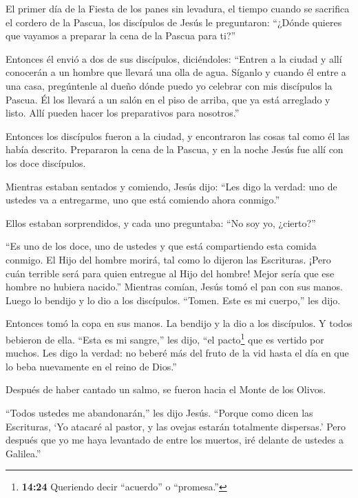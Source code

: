  El primer día de la Fiesta de los panes sin levadura, el
tiempo cuando se sacrifica el cordero de la Pascua, los discípulos de
Jesús le preguntaron: ``¿Dónde quieres que vayamos a preparar la cena de
la Pascua para ti?''

 Entonces él envió a dos de sus discípulos, diciéndoles:
``Entren a la ciudad y allí conocerán a un hombre que llevará una olla
de agua. Síganlo  y cuando él entre a una casa, pregúntenle
al dueño dónde puedo yo celebrar con mis discípulos la Pascua.
 Él los llevará a un salón en el piso de arriba, que ya
está arreglado y listo. Allí pueden hacer los preparativos para
nosotros.''

 Entonces los discípulos fueron a la ciudad, y encontraron
las cosas tal como él las había descrito. Prepararon la cena de la
Pascua,  y en la noche Jesús fue allí con los doce
discípulos.

 Mientras estaban sentados y comiendo, Jesús dijo: ``Les
digo la verdad: uno de ustedes va a entregarme, uno que está comiendo
ahora conmigo.''

 Ellos estaban sorprendidos, y cada uno preguntaba: ``No
soy yo, ¿cierto?''

 ``Es uno de los doce, uno de ustedes y que está
compartiendo esta comida conmigo.  El Hijo del hombre
morirá, tal como lo dijeron las Escrituras. ¡Pero cuán terrible será
para quien entregue al Hijo del hombre! Mejor sería que ese hombre no
hubiera nacido.''  Mientras comían, Jesús tomó el pan con
sus manos. Luego lo bendijo y lo dio a los discípulos. ``Tomen. Este es
mi cuerpo,'' les dijo.

 Entonces tomó la copa en sus manos. La bendijo y la dio a
los discípulos. Y todos bebieron de ella.  ``Esta es mi
sangre,'' les dijo, ``el pacto\footnote{\textbf{14:24} Queriendo decir
  ``acuerdo'' o ``promesa.''} que es vertido por muchos. 
Les digo la verdad: no beberé más del fruto de la vid hasta el día en
que lo beba nuevamente en el reino de Dios.''

 Después de haber cantado un salmo, se fueron hacia el
Monte de los Olivos.

 ``Todos ustedes me abandonarán,'' les dijo Jesús. ``Porque
como dicen las Escrituras, `Yo atacaré al pastor, y las ovejas estarán
totalmente dispersas.'  Pero después que yo me haya
levantado de entre los muertos, iré delante de ustedes a Galilea.''

